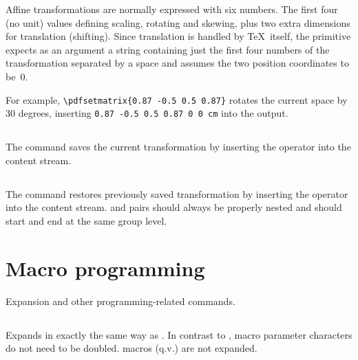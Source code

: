\documentclass{pdftexmanual}
\begin{document}
Affine transformations are normally expressed with six numbers. The
first four (no unit) values defining scaling, rotating and skewing, plus
two extra dimensions for translation (shifting). Since translation is
handled by \TeX\ itself, the  primitive expects as an
argument a string containing just the first four numbers of the
transformation separated by a space and assumes the two position
coordinates to be~0.

For example, \verb|\pdfsetmatrix{0.87 -0.5 0.5 0.87}| rotates the
current space by 30 degrees, inserting
\verb|0.87 -0.5 0.5 0.87 0 0 cm| into the output. 

\subsection{}

The command saves the current transformation by inserting the 
operator into the content stream. 

\subsection{}

The command restores previously saved transformation by inserting the
 operator into the content stream.  and
 pairs should always be properly nested and should start
and end at the same group level. 

\section{Macro programming}

Expansion and other programming-related commands.

\subsection{}

Expands  in exactly the same way as . In
contrast to , macro parameter characters do not need to be
doubled.  macros (q.v.) are not expanded.

\subsection{}
\end{document}
